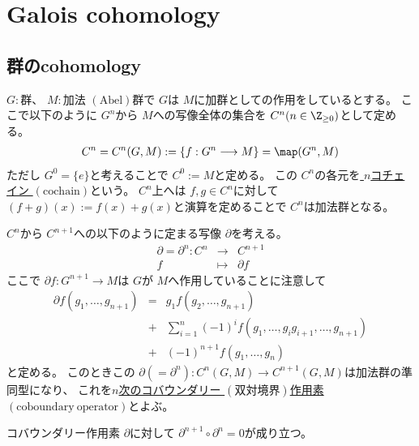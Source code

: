 \documentclass[../master_galois_theory]{subfiles}
\begin{document}
\setcounter{section}{13}

\section{Galois cohomology}

\subsection{群のcohomology}

\begin{defi} \label{defi:cochain}
  $G:$群、 $M:$加法 $(\mathrm{Abel})$群で
  $G$は $M$に加群としての作用をしているとする。
  ここで以下のように $G^n$から $M$への写像全体の集合を
  $C^n (n \in \Z_{\geq 0})$として定める。
  \begin{eqnarray*}
    C^n = C^n(G,M) := \{ f : G^n \longrightarrow M \} = \map(G^n,M)
  \end{eqnarray*}
  ただし $G^0 = \{ e \}$と考えることで $C^0 := M$と定める。
  この $C^n$の各元を\underline{ $n$コチェイン $(\mathrm{cochain})$}という。
  $C^n$上へは $f , g \in C^n$に対して
  $(f+g)(x) := f(x) + g(x)$と演算を定めることで $C^n$は加法群となる。
\end{defi}

\begin{defi} \label{defi:coboundary}
  $C^n$から $C^{n+1}$への以下のように定まる写像 $\partial$を考える。
  \begin{eqnarray*}
    \partial = \partial^n : C^n & \longrightarrow & C^{n+1} \\
    f & \longmapsto & \partial f
  \end{eqnarray*}
  ここで $\partial f : G^{n+1} \longrightarrow M$は
  $G$が $M$へ作用していることに注意して
  \begin{eqnarray*}
    \partial f(g_1 , \dots , g_{n+1}) & = & g_1 f(g_2 , \dots , g_{n+1}) \\
    & + & \sum_{i=1}^n (-1)^i f(g_1 , \dots , g_i g_{i+1} , \dots , g_{n+1}) \\
    & + & (-1)^{n+1} f(g_1 , \dots , g_n)
  \end{eqnarray*}
と定める。
このときこの $\partial (= \partial^n) : C^n(G,M) \longrightarrow C^{n+1}(G,M)$は加法群の準同型になり、
これを\underline{$n$次のコバウンダリー $(双対境界)$作用素 $(\mathrm{coboundary \  operator})$}とよぶ。
\end{defi}

\begin{prop}
  コバウンダリー作用素 $\partial$に対して $\partial^{n+1} \circ \partial^n = 0$が成り立つ。
\end{prop}
\end{document}

